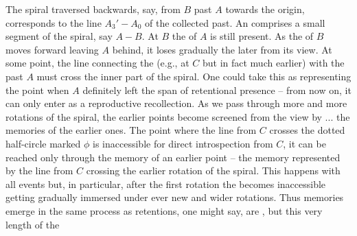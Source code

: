 \noindent
The spiral traversed backwards, say, from $B$ past $A$
towards the origin, corresponds to the line $A_3'-A_0$ of the collected past. An
 comprises a small segment of the spiral, say $A-B$. At
$B$ the  of $A$ is still present.
As the  of $B$ moves forward leaving $A$ behind, it loses gradually the
later from its view. At some point, the line connecting the  (e.g., at
$C$ but in fact much earlier) with the past $A$ must cross the inner part of the
spiral. One could take this as representing the point when $A$ definitely left
the span of retentional presence -- from now on, it can only enter  as
a reproductive recollection. As we pass through more and more rotations of the
spiral, the earlier points become screened from the view by ...  the memories of
the earlier ones. The point where the line from $C$ crosses the dotted
half-circle marked $\phi$ is inaccessible for direct introspection from $C$, it
can be reached only through the memory of an earlier point -- the memory
represented by the line from $C$ crossing the earlier rotation of the spiral.
This happens with all events but, in particular, after the first rotation the
 becomes inaccessible getting gradually immersed under ever new and
wider rotations. Thus memories emerge in the same process as retentions, one
might say, are , but this very length of the
